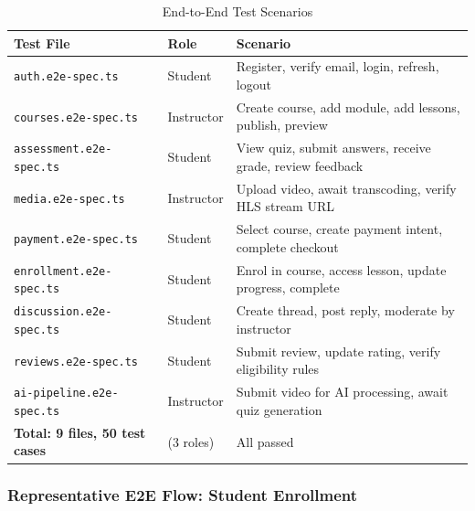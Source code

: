 \begin{table}[H]
  \centering
  \caption{End-to-End Test Scenarios}\label{tab:e2e-scenarios}
  \small
  \begin{tabular}{@{}p{3.5cm} p{1.8cm} p{\dimexpr\textwidth-6.3cm\relax}@{}}
    \toprule
    \textbf{Test File}                       & \textbf{Role}   & \textbf{Scenario} \\
    \midrule
    \rowcolor{green!10}
    \texttt{auth.e2e-spec.ts}                & Student         & Register, verify email, login, refresh, logout \\
    \rowcolor{green!10}
    \texttt{courses.e2e-spec.ts}             & Instructor      & Create course, add module, add lessons, publish, preview \\
    \rowcolor{green!10}
    \texttt{assessment.e2e-spec.ts}          & Student         & View quiz, submit answers, receive grade, review feedback \\
    \rowcolor{green!10}
    \texttt{media.e2e-spec.ts}               & Instructor      & Upload video, await transcoding, verify HLS stream URL \\
    \rowcolor{green!10}
    \texttt{payment.e2e-spec.ts}             & Student         & Select course, create payment intent, complete checkout \\
    \rowcolor{green!10}
    \texttt{enrollment.e2e-spec.ts}          & Student         & Enrol in course, access lesson, update progress, complete \\
    \rowcolor{green!10}
    \texttt{discussion.e2e-spec.ts}          & Student         & Create thread, post reply, moderate by instructor \\
    \rowcolor{green!10}
    \texttt{reviews.e2e-spec.ts}             & Student         & Submit review, update rating, verify eligibility rules \\
    \rowcolor{green!10}
    \texttt{ai-pipeline.e2e-spec.ts}         & Instructor      & Submit video for AI processing, await quiz generation \\
    \midrule
    \textbf{Total: 9 files, 50 test cases}  & (3 roles)       & All passed \\
    \bottomrule
  \end{tabular}
\end{table}

\subsubsection{Representative E2E Flow: Student Enrollment}

